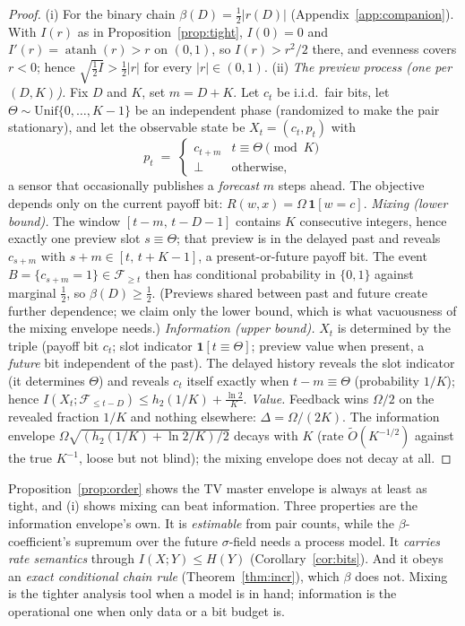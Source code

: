 \documentclass[acmsmall,screen,review,anonymous]{acmart}
\begin{document}
\begin{proof}
(i) For the binary chain $\beta(D)=\tfrac12 |r(D)|$
(Appendix~\ref{app:companion}). With $I(r)$ as in
Proposition~\ref{prop:tight}, $I(0)=0$ and
$I'(r)=\operatorname{atanh}(r)>r$ on $(0,1)$, so $I(r)>r^2/2$ there, and
evenness covers $r<0$; hence $\sqrt{\tfrac12 I}>\tfrac12|r|$ for every
$|r|\in(0,1)$.
(ii) \emph{The preview process (one per $(D,K)$).} Fix $D$ and $K$, set
$m=D+K$. Let $c_t$ be i.i.d.\ fair bits, let
$\Theta\sim\mathrm{Unif}\{0,\dots,K{-}1\}$ be an independent phase
(randomized to make the pair stationary), and let the observable state be
$X_t=(c_t,p_t)$ with
\[
p_t \;=\; \begin{cases} c_{t+m} & t\equiv\Theta \pmod K\\
\bot & \text{otherwise},\end{cases}
\]
a sensor that occasionally publishes a \emph{forecast} $m$ steps ahead. The
objective depends only on the current payoff bit:
$R(w,x)=\Omega\,\mathbf 1[w=c]$.
\emph{Mixing (lower bound).} The window $[t-m,\,t-D-1]$ contains $K$
consecutive integers, hence exactly one preview slot
$s\equiv\Theta$; that preview is in the
delayed past and reveals $c_{s+m}$ with $s+m\in[t,\,t+K-1]$, a
present-or-future payoff bit. The event $B=\{c_{s+m}=1\}\in\mathcal F_{\ge t}$
then has conditional probability in $\{0,1\}$ against marginal $\tfrac12$,
so $\beta(D)\ge\tfrac12$. (Previews shared between past and future create
further dependence; we claim only the lower bound, which is what vacuousness
of the mixing envelope needs.)
\emph{Information (upper bound).} $X_t$ is determined by the triple
(payoff bit $c_t$; slot indicator $\mathbf 1[t\equiv\Theta]$; preview value
when present, a \emph{future} bit independent of the past). The delayed
history reveals the slot indicator (it determines $\Theta$) and reveals
$c_t$ itself exactly when $t-m\equiv\Theta$ (probability $1/K$); hence
$I(X_t;\mathcal F_{\le t-D})\le h_2(1/K)+\tfrac{\ln2}{K}$.
\emph{Value.} Feedback wins $\Omega/2$ on the revealed fraction $1/K$ and
nothing elsewhere: $\Delta=\Omega/(2K)$. The information envelope
$\Omega\sqrt{(h_2(1/K)+\ln2/K)/2}$ decays with $K$ (rate
$\widetilde O(K^{-1/2})$ against the true $K^{-1}$, loose but not
blind); the mixing envelope does not decay at all.
\end{proof}

\begin{remark}
Proposition~\ref{prop:order} shows the TV master envelope is always at least
as tight, and (i) shows mixing can beat information. Three properties are the
information envelope's own. It is \emph{estimable} from pair counts, while
the $\beta$-coefficient's supremum over the future $\sigma$-field needs a
process model. It \emph{carries rate semantics} through $I(X;Y)\le H(Y)$
(Corollary~\ref{cor:bits}). And it obeys an \emph{exact conditional chain
rule} (Theorem~\ref{thm:incr}), which $\beta$ does not. Mixing is the
tighter analysis tool when a model is in hand; information is the
operational one when only data or a bit budget is.
\end{remark}
\end{document}
